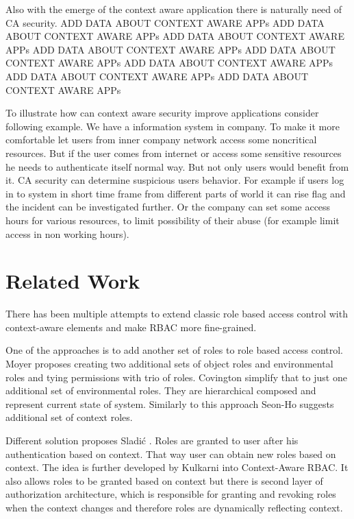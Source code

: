 \documentclass{poster15}
\begin{document}
Also with the emerge of the context aware application there is naturally need of CA security. ADD DATA ABOUT CONTEXT AWARE APPs ADD DATA ABOUT CONTEXT AWARE APPs ADD DATA ABOUT CONTEXT AWARE APPs ADD DATA ABOUT CONTEXT AWARE APPs ADD DATA ABOUT CONTEXT AWARE APPs ADD DATA ABOUT CONTEXT AWARE APPs ADD DATA ABOUT CONTEXT AWARE APPs ADD DATA ABOUT CONTEXT AWARE APPs

To illustrate how can context aware security improve applications consider following example. We have a information system in company. To make it more comfortable let users from inner company network access some noncritical resources. But if the user comes from internet or access some sensitive resources he needs to authenticate itself normal way. But not only users would benefit from it. CA security can determine suspicious users behavior. For example if users log in to system in short time frame from different parts of world it can rise flag and the incident can be investigated further. Or the company can set some access hours for various resources, to limit possibility of their abuse (for example limit access in non working hours).

\section{Related Work}

There has been multiple attempts to extend classic role based access control with context-aware elements and make RBAC more fine-grained.

One of the approaches is to add another set of roles to role based access control. Moyer \cite{grbac} proposes creating two additional sets of object roles and environmental roles and tying permissions with trio of roles. Covington \cite{envroles} simplify that to just one additional set of environmental roles. They are hierarchical composed and represent current state of system. Similarly to this approach Seon-Ho \cite{contextroles} suggests additional set of context roles.

Different solution proposes Sladi\'c \cite{contextaccess}. Roles are granted to user after his authentication based on context. That way user can obtain new roles based on context. The idea is further developed by Kulkarni \cite{contextawarerbac} into Context-Aware RBAC. It also allows roles to be granted based on context but there is second layer of authorization architecture, which is responsible for granting and revoking roles when the context changes and therefore roles are dynamically reflecting context.
\end{document}
